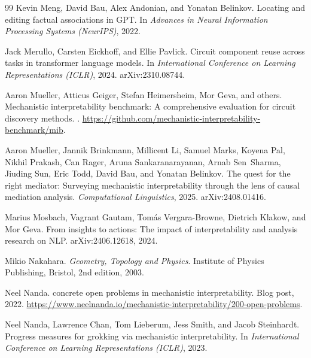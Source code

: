 \documentclass{article}
\begin{document}
\begin{thebibliography}{99}
Kevin Meng, David Bau, Alex Andonian, and Yonatan Belinkov.
\newblock Locating and editing factual associations in {GPT}.
\newblock In \emph{Advances in Neural Information Processing Systems (NeurIPS)}, 2022.

Jack Merullo, Carsten Eickhoff, and Ellie Pavlick.
\newblock Circuit component reuse across tasks in transformer language models.
\newblock In \emph{International Conference on Learning Representations
  (ICLR)}, 2024.
\newblock arXiv:2310.08744.

Aaron Mueller, Atticus Geiger, Stefan Heimersheim, Mor Geva, and others.
\newblock Mechanistic interpretability benchmark: A comprehensive evaluation
  for circuit discovery methods.
.
\newblock \url{https://github.com/mechanistic-interpretability-benchmark/mib}.

Aaron Mueller, Jannik Brinkmann, Millicent Li, Samuel Marks, Koyena Pal, Nikhil
  Prakash, Can Rager, Aruna Sankaranarayanan, Arnab Sen~Sharma, Jiuding Sun,
  Eric Todd, David Bau, and Yonatan Belinkov.
\newblock The quest for the right mediator: Surveying mechanistic
  interpretability through the lens of causal mediation analysis.
\newblock \emph{Computational Linguistics}, 2025.
\newblock arXiv:2408.01416.

Marius Mosbach, Vagrant Gautam, Tom\'as Vergara-Browne, Dietrich Klakow, and
  Mor Geva.
\newblock From insights to actions: The impact of interpretability and analysis
  research on {NLP}.
\newblock arXiv:2406.12618, 2024.

Mikio Nakahara.
\newblock \emph{Geometry, Topology and Physics}.
\newblock Institute of Physics Publishing, Bristol, 2nd edition, 2003.

Neel Nanda.
 concrete open problems in mechanistic interpretability.
\newblock Blog post, 2022.
\newblock \url{https://www.neelnanda.io/mechanistic-interpretability/200-open-problems}.

Neel Nanda, Lawrence Chan, Tom Lieberum, Jess Smith, and Jacob Steinhardt.
\newblock Progress measures for grokking via mechanistic interpretability.
\newblock In \emph{International Conference on Learning Representations (ICLR)}, 2023.


\end{thebibliography}
\end{document}
